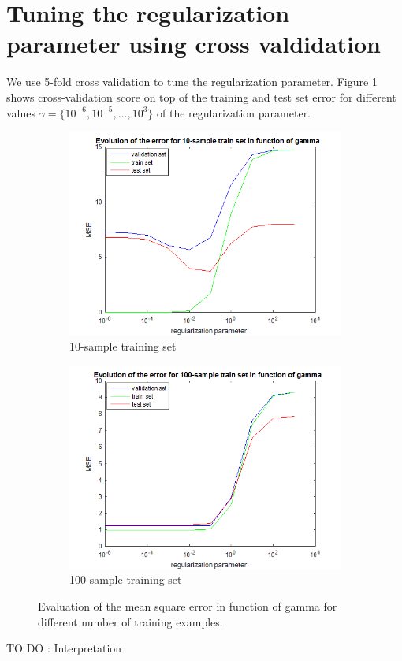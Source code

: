 \documentclass{article} %
\begin{document}
\section{Tuning the regularization parameter using cross valdidation}
We use 5-fold cross validation to tune the regularization parameter. Figure \ref{fig:ex6} shows cross-validation score on top of the training and test set error for different values $\gamma = \{10^{-6}, 10^{-5}, \dots, 10^3 \}$ of the regularization parameter.

\begin{figure}[h]
    \centering
    \begin{subfigure}[b]{0.45\textwidth}
        \includegraphics[width=\textwidth]{ex6_10}
        \caption{10-sample training set}
    \end{subfigure}
    \begin{subfigure}[b]{0.45\textwidth}
        \includegraphics[width=\textwidth]{ex6_100}
        \caption{100-sample training set}
    \end{subfigure}
    \caption{Evaluation of the mean square error in function of gamma for different number of training examples.}
    \label{fig:ex6}
\end{figure}
 TO DO :
Interpretation
\end{document}
